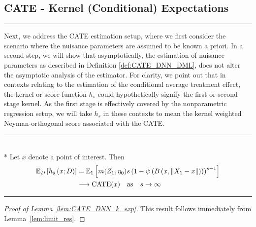 \subsection{CATE - Kernel (Conditional) Expectations}
\hrule
Next, we address the CATE estimation setup, where we first consider the scenario where the nuisance parameters are assumed to be known a priori.
In a second step, we will show that asymptotically, the estimation of nuisance parameters as described in Definition \ref{def:CATE_DNN_DML}, does not alter the asymptotic analysis of the estimator.
For clarity, we point out that in contexts relating to the estimation of the conditional average treatment effect, the kernel or score function $h_s$ could hypothetically signify the first or second stage kernel.
As the first stage is effectively covered by the nonparametric regression setup, we will take $h_s$ in these contexts to mean the kernel weighted Neyman-orthogonal score associated with the CATE.
\vspace{0.5cm}
\hrule

\begin{lem}\label{lem:CATE_DNN_k_exp}\mbox{}\\*
	Let $x$ denote a point of interest.
	Then
	\begin{equation}
		\begin{aligned}
			\mathbb{E}_D\left[h_s\left(x; D\right)\right]
			& = \mathbb{E}_{1}\left[m(Z_1, \eta_0)
			s\left(1 - \psi\left(B\left(x, \|X_1 - x\|\right)\right)\right)^{s-1}\right]\\
			& \longrightarrow \operatorname{CATE}(x) \quad \text{as} \quad s \rightarrow \infty
		\end{aligned}
	\end{equation}
\end{lem}
\hrule
\begin{proof}[Proof of Lemma~\ref{lem:CATE_DNN_k_exp}]
	This result follows immediately from Lemma~\ref{lem:limit_res}.
\end{proof}

